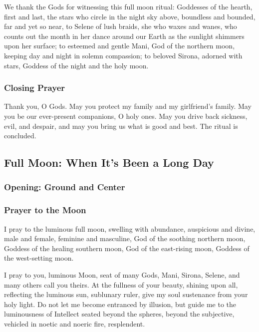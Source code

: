 \documentclass[
]{book}
\begin{document}
We thank the Gods for witnessing this full moon ritual:
Goddesses of the hearth, first and last,
the stars who circle in the night sky above,
boundless and bounded, far and yet so near,
to Selene of lush braids,
she who waxes and wanes,
who counts out the month in her dance
around our Earth as the sunlight shimmers upon her surface;
to esteemed and gentle Mani,
God of the northern moon,
keeping day and night in solemn compassion;
to beloved Sirona, adorned with stars,
Goddess of the night and the holy moon.

\hypertarget{closing-prayer-1}{%
\subsubsection{Closing Prayer}\label{closing-prayer-1}}

Thank you, O Gods.
May you protect my family and my girlfriend's family.
May you be our ever-present companions, O holy ones.
May you drive back sickness, evil, and despair,
and may you bring us what is good and best.
The ritual is concluded.

\hypertarget{full-moon-when-its-been-a-long-day}{%
\subsection{Full Moon: When It's Been a Long Day}\label{full-moon-when-its-been-a-long-day}}

\hypertarget{opening-ground-and-center-2}{%
\subsubsection{Opening: Ground and Center}\label{opening-ground-and-center-2}}

\hypertarget{prayer-to-the-moon-2}{%
\subsubsection{Prayer to the Moon}\label{prayer-to-the-moon-2}}

I pray to the luminous full moon,
swelling with abundance,
auspicious and divine,
male and female, feminine and masculine,
God of the soothing northern moon,
Goddess of the healing southern moon,
God of the east-rising moon,
Goddess of the west-setting moon.

I pray to you, luminous Moon, seat of many Gods,
Mani, Sirona, Selene, and many others call you theirs.
At the fullness of your beauty, shining upon all,
reflecting the luminous sun, sublunary ruler,
give my soul sustenance from your holy light.
Do not let me become entranced by illusion,
but guide me to the luminousness of Intellect
seated beyond the spheres, beyond the subjective,
vehicled in noetic and noeric fire, resplendent.
\end{document}

